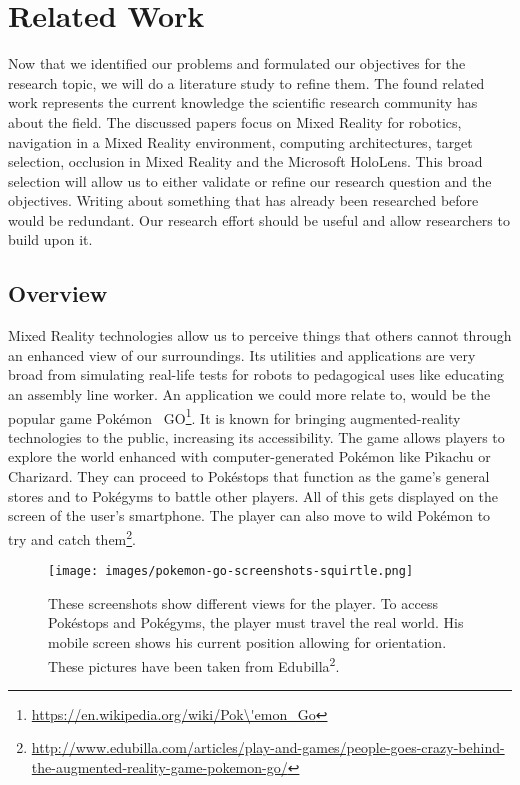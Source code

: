 
\chapter{Related Work}
Now that we identified our problems and formulated our objectives for the research topic, we will do a literature study to refine them. The found related work represents the current knowledge the scientific research community has about the field. The discussed papers focus on Mixed Reality for robotics, navigation in a Mixed Reality environment, computing architectures, target selection, occlusion in Mixed Reality and the Microsoft HoloLens.
This broad selection will allow us to either validate or refine our research question and the objectives. Writing about something that has already been researched before would be redundant. Our research effort should be useful and allow researchers to build upon it.

\section{Overview}
Mixed Reality technologies allow us to perceive things that others cannot through an enhanced view of our surroundings. Its utilities and applications are very broad from simulating real-life tests for robots\cite{hoenig2015mixed} to pedagogical uses like educating an assembly line worker\cite{evans2017evaluating}. \newline
An application we could more relate to, would be the popular game \mbox{Pok\'emon} ~GO\footnote{\protect\url{https://en.wikipedia.org/wiki/Pok\'emon\_Go}}. It is known for bringing augmented-reality technologies to the public, increasing its accessibility.
The game allows players to explore the world enhanced with computer-generated Pok\'emon like Pikachu or Charizard. They can proceed to Pok\'estops that function as the game's general stores and to Pok\'egyms to battle other players. All of this gets displayed on the screen of the user's smartphone. The player can also move to wild Pok\'emon to try and catch them\footnote{\url{http://www.edubilla.com/articles/play-and-games/people-goes-crazy-behind-the-augmented-reality-game-pokemon-go/}}.\newline

\begin{figure}[!htb]
	\texttt{[image: images/pokemon-go-screenshots-squirtle.png]}
	\captionsetup{width=1.0\textwidth}
	\centering
	\caption{These screenshots show different views for the player. To access Pok\'estops   and Pok\'egyms, the player must travel the real world. His mobile screen shows his current position allowing for orientation. These pictures have been taken from Edubilla\textsuperscript{2}.} 
\end{figure}


